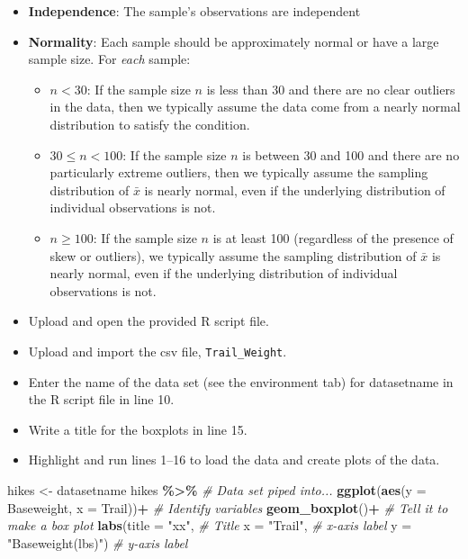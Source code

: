 \documentclass[
]{report}
\newenvironment{Shaded}{\begin{snugshade}}{\end{snugshade}}
\newcommand{\AttributeTok}[1]{\textcolor[rgb]{0.13,0.29,0.53}{#1}}
\newcommand{\CommentTok}[1]{\textcolor[rgb]{0.56,0.35,0.01}{\textit{#1}}}
\newcommand{\FunctionTok}[1]{\textcolor[rgb]{0.13,0.29,0.53}{\textbf{#1}}}
\newcommand{\NormalTok}[1]{#1}
\newcommand{\OtherTok}[1]{\textcolor[rgb]{0.56,0.35,0.01}{#1}}
\newcommand{\SpecialCharTok}[1]{\textcolor[rgb]{0.81,0.36,0.00}{\textbf{#1}}}
\newcommand{\StringTok}[1]{\textcolor[rgb]{0.31,0.60,0.02}{#1}}
\begin{document}
\begin{itemize}
\item
  \textbf{Independence}: The sample's observations are independent
\item
  \textbf{Normality}: Each sample should be approximately normal or have a large sample size. For \emph{each} sample:

  \begin{itemize}
  \item
    \(n < 30\): If the sample size \(n\) is less than 30 and there are no clear outliers in the data, then we typically assume the data come from a nearly normal distribution to satisfy the condition.
  \item
    \(30 \le n < 100\): If the sample size \(n\) is between 30 and 100 and there are no particularly extreme outliers, then we typically assume the sampling distribution of \(\bar{x}\) is nearly normal, even if the underlying distribution of individual observations is not.
  \item
    \(n \geq 100\): If the sample size \(n\) is at least 100 (regardless of the presence of skew or outliers), we typically assume the sampling distribution of \(\bar{x}\) is nearly normal, even if the underlying distribution of individual observations is not.
  \end{itemize}
\item
  Upload and open the provided R script file.
\item
  Upload and import the csv file, \texttt{Trail\_Weight}.
\item
  Enter the name of the data set (see the environment tab) for datasetname in the R script file in line 10.
\item
  Write a title for the boxplots in line 15.
\item
  Highlight and run lines 1--16 to load the data and create plots of the data.
\end{itemize}

\begin{Shaded}
\begin{Highlighting}[]
\NormalTok{hikes }\OtherTok{\textless{}{-}}\NormalTok{ datasetname}
\NormalTok{hikes }\SpecialCharTok{\%\textgreater{}\%}  \CommentTok{\# Data set piped into...}
  \FunctionTok{ggplot}\NormalTok{(}\FunctionTok{aes}\NormalTok{(}\AttributeTok{y =}\NormalTok{ Baseweight, }\AttributeTok{x =}\NormalTok{ Trail))}\SpecialCharTok{+}  \CommentTok{\# Identify variables}
  \FunctionTok{geom\_boxplot}\NormalTok{()}\SpecialCharTok{+}  \CommentTok{\# Tell it to make a box plot}
  \FunctionTok{labs}\NormalTok{(}\AttributeTok{title =} \StringTok{"xx"}\NormalTok{,  }\CommentTok{\# Title}
       \AttributeTok{x =} \StringTok{"Trail"}\NormalTok{,    }\CommentTok{\# x{-}axis label}
       \AttributeTok{y =} \StringTok{"Baseweight(lbs)"}\NormalTok{)  }\CommentTok{\# y{-}axis label}
\end{Highlighting}
\end{Shaded}
\end{document}
